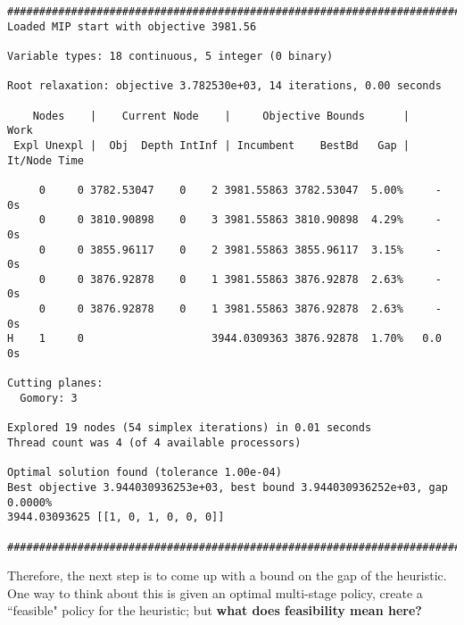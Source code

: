 \documentclass[10pt]{article}
\theoremstyle{plain}
\theoremstyle{definition}
\theoremstyle{remark}
\begin{document}
\begin{minipage}[t]{8cm}
\tiny\begin{verbatim}
####################################################################################
Loaded MIP start with objective 3981.56

Variable types: 18 continuous, 5 integer (0 binary)

Root relaxation: objective 3.782530e+03, 14 iterations, 0.00 seconds

    Nodes    |    Current Node    |     Objective Bounds      |     Work
 Expl Unexpl |  Obj  Depth IntInf | Incumbent    BestBd   Gap | It/Node Time

     0     0 3782.53047    0    2 3981.55863 3782.53047  5.00%     -    0s
     0     0 3810.90898    0    3 3981.55863 3810.90898  4.29%     -    0s
     0     0 3855.96117    0    2 3981.55863 3855.96117  3.15%     -    0s
     0     0 3876.92878    0    1 3981.55863 3876.92878  2.63%     -    0s
     0     0 3876.92878    0    1 3981.55863 3876.92878  2.63%     -    0s
H    1     0                    3944.0309363 3876.92878  1.70%   0.0    0s

Cutting planes:
  Gomory: 3

Explored 19 nodes (54 simplex iterations) in 0.01 seconds
Thread count was 4 (of 4 available processors)

Optimal solution found (tolerance 1.00e-04)
Best objective 3.944030936253e+03, best bound 3.944030936252e+03, gap 0.0000%
3944.03093625 [[1, 0, 1, 0, 0, 0]]

####################################################################################
\end{verbatim}
\end{minipage}
\vskip 0.5cm
Therefore, the next step is to come up with a bound on the gap of the heuristic.
One way to think about this is given an optimal multi-stage policy, create a ``feasible"
policy for the heuristic; but {\bf what does feasibility mean here?}

\end{document}
